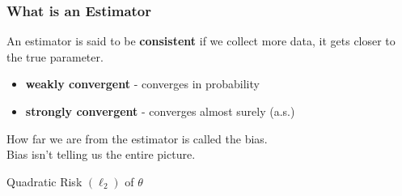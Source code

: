 \subsubsection{What is an Estimator}


An estimator is said to be \textbf{consistent} if we collect more data, it gets closer to the true parameter.

\begin{itemize}
    \item \textbf{weakly convergent} - converges in probability
    \item \textbf{strongly convergent} - converges almost surely (a.s.)
\end{itemize}

 How far we are from the estimator is called the bias.\\
 Bias isn't telling us the entire picture.

 Quadratic Risk $(\ell_2)$ of $\theta$